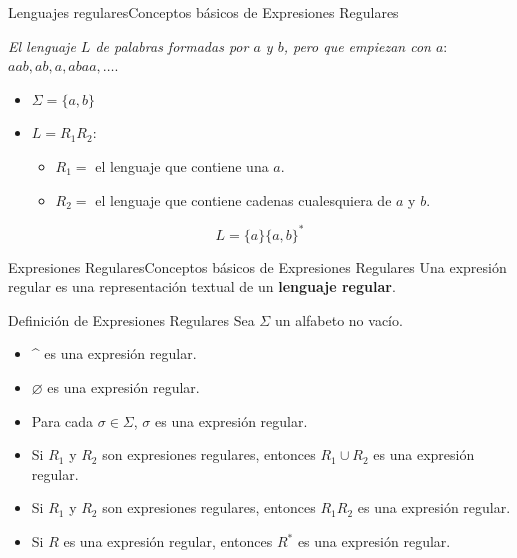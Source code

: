 \documentclass[spanish]{beamer}
\begin{document}
\begin{frame}{Lenguajes regulares}{Conceptos básicos de Expresiones Regulares}

    \textit{El lenguaje $L$ de palabras formadas por $a$ y $b$, pero que empiezan con $a$}: $aab, ab, a, abaa, \dots$. \pause

    \begin{itemize}
        \itemsep1.25em
        \item $\Sigma = \{a, b\}$ \pause
        \item $L = R_1 R_2$: \pause
            \begin{itemize}
                \item $R_1 = $ el lenguaje que contiene una $a$. \pause
                \item $R_2 = $ el lenguaje que contiene cadenas cualesquiera de $a$ y $b$. \pause
            \end{itemize}
    \end{itemize}

    \[L = \{a\}\{a,b\}^* \]
\end{frame}

\begin{frame}{Expresiones Regulares}{Conceptos básicos de Expresiones Regulares}
    Una \alert{expresión regular} es una representación textual de un \textbf{lenguaje regular}. \pause

    \begin{block}{Definición de Expresiones Regulares}
        Sea $\Sigma$ un alfabeto no vacío. \pause

        \begin{itemize}
            \item \^{} es una expresión regular. \pause
            \item $\varnothing$ es una expresión regular. \pause
            \item Para cada $\sigma \in \Sigma$, $\sigma$ es una expresión regular. \pause
            \item Si $R_1$ y $R_2$ son expresiones regulares, entonces $R_1 \cup R_2$ es una expresión regular. \pause
            \item Si $R_1$ y $R_2$ son expresiones regulares, entonces $R_1 R_2$ es una expresión regular. \pause
            \item Si $R$ es una expresión regular, entonces $R^*$ es una expresión regular.
        \end{itemize}
    \end{block}
    
\end{frame}
\end{document}

